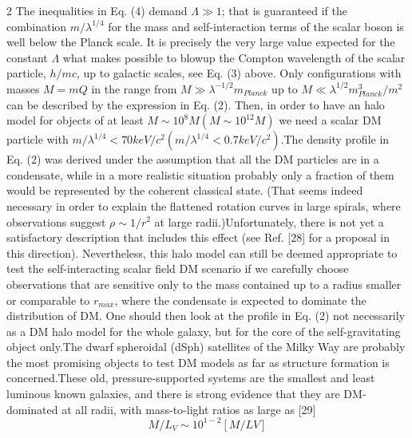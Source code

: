 \documentclass{article}
\begin{document}
\begin{multicols} {2}
The inequalities in Eq. (4) demand $\Lambda \gg1$; that is guaranteed if the combination $m/\lambda^{1/4}$ for the mass and self-interaction  terms  of  the  scalar  boson  is  well  below  the Planck  scale.    It  is  precisely  the  very  large  value  expected for the constant $\Lambda$ what makes possible to blowup the Compton wavelength of the scalar particle, $h/mc$, up  to  galactic  scales,  see  Eq.  (3)  above. Only  configurations  with  masses $M=mQ$ in  the  range  from $M\gg \lambda^{−1/2}m_{Planck}$ up to $M\ll \lambda^{1/2}m^{3}_{Planck}/m^2$ can be described by the expression in Eq. (2).  Then, in order to have an halo model for objects of at least $M\sim10^{8}M(M\sim10^{12}M)$ we  need  a  scalar  DM  particle  with $m/\lambda^{1/4}<70keV/c^2(m/\lambda^{1/4}<0.7keV/c^2)$.The  density  profile  in  Eq.  (2)  was  derived  under  the assumption  that  all  the  DM  particles  are  in  a  condensate,  while  in  a  more  realistic  situation  probably  only a  fraction  of  them  would  be  represented  by  the  coherent classical state.  (That seems indeed necessary in order to explain the flattened rotation curves in large spirals, where observations suggest $\rho \sim1/r^2$ at large radii.)Unfortunately, there is not yet a satisfactory description that includes this effect (see Ref. [28] for a proposal in this  direction).   Nevertheless,  this  halo  model  can  still be deemed appropriate to test the self-interacting scalar field DM scenario if we carefully choose observations that are sensitive only to the mass contained up to a radius smaller or comparable to $r_{max}$, where the condensate is expected to dominate the distribution of DM. One should then look at the profile in Eq. (2) not necessarily as a DM halo model for the whole galaxy, but for the core of the self-gravitating object only.The  dwarf  spheroidal  (dSph)  satellites  of  the  Milky Way  are  probably  the  most  promising  objects  to  test DM  models  as  far  as  structure  formation  is  concerned.These  old,  pressure-supported  systems  are  the  smallest and least luminous known galaxies,  and there is strong evidence that they are DM-dominated at all radii, with mass-to-light ratios as large as [29]
\begin{equation}
M/L_V \sim 10^{1−2}[M/LV]
\end{equation}

\end{multicols}
\end{document}
